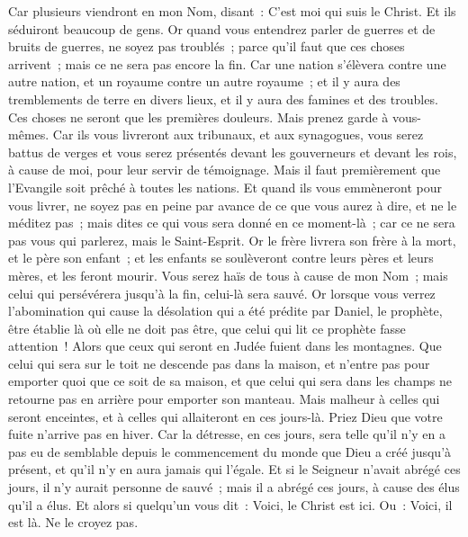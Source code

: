 \begin{multicols}{2}
Car plusieurs viendront en mon Nom, disant~: C'est moi qui suis le Christ. Et ils séduiront beaucoup de gens.
Or quand vous entendrez parler de guerres et de bruits de guerres, ne soyez pas troublés~; parce qu'il faut que ces choses arrivent~; mais ce ne sera pas encore la fin.
Car une nation s'élèvera contre une autre nation, et un royaume contre un autre royaume~; et il y aura des tremblements de terre en divers lieux, et il y aura des famines et des troubles. Ces choses ne seront que les premières douleurs.
Mais prenez garde à vous-mêmes. Car ils vous livreront aux tribunaux, et aux synagogues, vous serez battus de verges et vous serez présentés devant les gouverneurs et devant les rois, à cause de moi, pour leur servir de témoignage.
Mais il faut premièrement que l'Evangile soit prêché à toutes les nations.
Et quand ils vous emmèneront pour vous livrer, ne soyez pas en peine par avance de ce que vous aurez à dire, et ne le méditez pas~; mais dites ce qui vous sera donné en ce moment-là~; car ce ne sera pas vous qui parlerez, mais le Saint-Esprit.
Or le frère livrera son frère à la mort, et le père son enfant~; et les enfants se soulèveront contre leurs pères et leurs mères, et les feront mourir.
Vous serez haïs de tous à cause de mon Nom~; mais celui qui persévérera jusqu'à la fin, celui-là sera sauvé.
Or lorsque vous verrez l'abomination qui cause la désolation qui a été prédite par Daniel, le prophète, être établie là où elle ne doit pas être, que celui qui lit ce prophète fasse attention~! Alors que ceux qui seront en Judée fuient dans les montagnes.
Que celui qui sera sur le toit ne descende pas dans la maison, et n'entre pas pour emporter quoi que ce soit de sa maison,
et que celui qui sera dans les champs ne retourne pas en arrière pour emporter son manteau.
Mais malheur à celles qui seront enceintes, et à celles qui allaiteront en ces jours-là.
Priez Dieu que votre fuite n'arrive pas en hiver.
Car la détresse, en ces jours, sera telle qu'il n'y en a pas eu de semblable depuis le commencement du monde que Dieu a créé jusqu'à présent, et qu'il n'y en aura jamais qui l'égale.
Et si le Seigneur n'avait abrégé ces jours, il n'y aurait personne de sauvé~; mais il a abrégé ces jours, à cause des élus qu'il a élus.
Et alors si quelqu'un vous dit~: Voici, le Christ est ici. Ou~: Voici, il est là. Ne le croyez pas.

\end{multicols}
